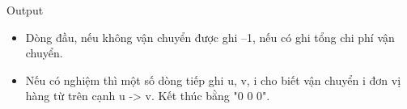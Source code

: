 Output
\begin{itemize}
	\item Dòng đầu, nếu không vận chuyển được ghi –1, nếu có ghi tổng chi phí vận chuyển.
	\item Nếu có nghiệm thì một số dòng tiếp ghi u, v, i cho biết vận chuyển i đơn vị hàng từ trên cạnh u -> v. Kết thúc bằng "0 0 0".
\end{itemize}